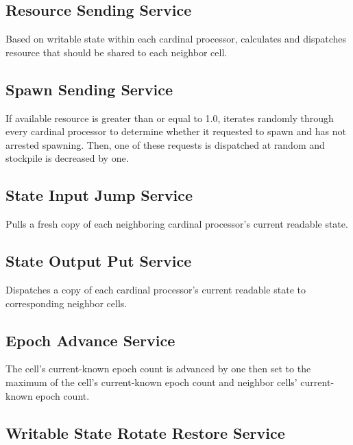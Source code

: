 \subsection{Resource Sending Service}


Based on writable state within each cardinal processor, calculates and dispatches resource that should be shared to each neighbor cell.

\subsection{Spawn Sending Service}


If available resource is greater than or equal to 1.0, iterates randomly through every cardinal processor to determine whether it requested to spawn and has not arrested spawning.
Then, one of these requests is dispatched at random and stockpile is decreased by one.

\subsection{State Input Jump Service}


Pulls a fresh copy of each neighboring cardinal processor's current readable state.

\subsection{State Output Put Service}


Dispatches a copy of each cardinal processor's current readable state to corresponding neighbor cells.

\subsection{Epoch Advance Service}


The cell's current-known epoch count is advanced by one then set to the maximum of the cell's current-known epoch count and neighbor cells' current-known epoch count.

\subsection{Writable State Rotate Restore Service}

